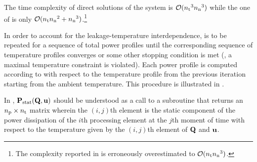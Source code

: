 The time complexity of direct solutions of the system is $\mathcal{O}({n_\text{t}}^3 {n_\text{n}}^3)$ while the one of  is only $\mathcal{O}({n_\text{t}} {n_\text{n}}^2 + {n_\text{n}}^3)$.\footnote{The complexity reported in \cite{ukhov2012} is erroneously overestimated to $\mathcal{O}({n_\text{t}} {n_\text{n}}^3)$.}

In order to account for the leakage-temperature interdependence,  is to be repeated for a sequence of total power profiles until the corresponding sequence of temperature profiles converges or some other stopping condition is met (\eg, a maximal temperature constraint is violated).
Each power profile is computed according to  with respect to the temperature profile from the previous iteration starting from the ambient temperature.
This procedure is illustrated in .


In , $\mathbf{P}_{\text{stat}}(\mathbf{Q}, \mathbf{u})$ should be understood as a call to a subroutine that returns an ${n_\text{p}} \times {n_\text{t}}$ matrix wherein the $(i, j)$th element is the static component of the power dissipation of the $i$th processing element at the $j$th moment of time with respect to the temperature given by the $(i, j)$th element of $\mathbf{Q}$ and $\mathbf{u}$.
